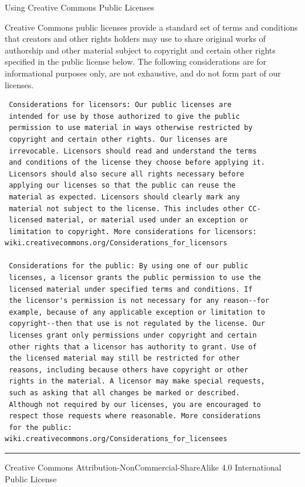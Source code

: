 \documentclass[
]{scrbook}
\begin{document}
Using Creative Commons Public Licenses

Creative Commons public licenses provide a standard set of terms and
conditions that creators and other rights holders may use to share
original works of authorship and other material subject to copyright and
certain other rights specified in the public license below. The
following considerations are for informational purposes only, are not
exhaustive, and do not form part of our licenses.

\begin{verbatim}
 Considerations for licensors: Our public licenses are
 intended for use by those authorized to give the public
 permission to use material in ways otherwise restricted by
 copyright and certain other rights. Our licenses are
 irrevocable. Licensors should read and understand the terms
 and conditions of the license they choose before applying it.
 Licensors should also secure all rights necessary before
 applying our licenses so that the public can reuse the
 material as expected. Licensors should clearly mark any
 material not subject to the license. This includes other CC-
 licensed material, or material used under an exception or
 limitation to copyright. More considerations for licensors:
wiki.creativecommons.org/Considerations_for_licensors

 Considerations for the public: By using one of our public
 licenses, a licensor grants the public permission to use the
 licensed material under specified terms and conditions. If
 the licensor's permission is not necessary for any reason--for
 example, because of any applicable exception or limitation to
 copyright--then that use is not regulated by the license. Our
 licenses grant only permissions under copyright and certain
 other rights that a licensor has authority to grant. Use of
 the licensed material may still be restricted for other
 reasons, including because others have copyright or other
 rights in the material. A licensor may make special requests,
 such as asking that all changes be marked or described.
 Although not required by our licenses, you are encouraged to
 respect those requests where reasonable. More considerations
 for the public:
wiki.creativecommons.org/Considerations_for_licensees
\end{verbatim}

\begin{center}\rule{0.5\linewidth}{0.5pt}\end{center}

Creative Commons Attribution-NonCommercial-ShareAlike 4.0 International
Public License
\end{document}
